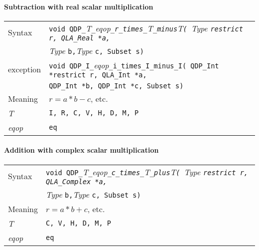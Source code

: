 \documentclass{article}
\newcommand{\tInt}{QDP\ttdash Int }
\newcommand{\tqlaReal}{QLA\ttdash Real }
\newcommand{\tqlaComplex}{QLA\ttdash Complex }
\newcommand{\tqlaInt}{QLA\ttdash Int }
\newcommand{\namespace}{QDP}
\newcommand{\allNumericTypes}{{\tt I, R, C, V, H, D, M, P}}
\newcommand{\ttdash}{{\tt \_}}
\newcommand{\itt}{\it T}
\newcommand{\extraarg}{, Subset s}
\begin{document}
\paragraph{Subtraction with real scalar multiplication}

\begin{flushleft}
  \begin{tabular}{|l|l|}
  \hline
  Syntax      & {{\tt void \namespace}\ttdash\itt\ttdash{\it eqop}\ttdash{\tt r}\ttdash{\tt times}\ttdash\itt\ttdash{\tt minus}\itt{\tt ( }{\it Type }{\tt *restrict r, \tqlaReal *a,}}\\
              & {{\it Type }{\tt *b,}{\it Type }{\tt *c\extraarg)}} \\
  exception   & {\tt void \namespace}\ttdash{\tt I}\ttdash{\it eqop}\ttdash{\tt i}\ttdash{\tt times}\ttdash{\tt I}\ttdash{\tt minus}\ttdash{\tt I( \tInt *restrict r, \tqlaInt *a,}\\
              & {\tt \tInt *b, \tInt *c\extraarg)} \\
  \hline
  Meaning     & $r = a * b - c$, etc. \\
  \hline
  \itt        & \allNumericTypes \\
  \hline
  {\it eqop}  & {\tt eq} \\
  \hline
  \end{tabular}
\end{flushleft}

\paragraph{Addition with complex scalar multiplication}

\begin{flushleft}
  \begin{tabular}{|l|l|}
  \hline
  Syntax      & {\tt void \namespace}\ttdash\itt\ttdash{\it eqop}\ttdash{\tt c}\ttdash{\tt times}\ttdash\itt\ttdash{\tt plus}\itt{\tt ( }{\it Type }{\tt *restrict r, }{\tt \tqlaComplex *a, }\\
              & {\it Type }{\tt *b,}{\it Type }{\tt *c\extraarg)} \\
  \hline
  Meaning     & $r = a * b + c$, etc. \\
  \hline
  \itt        & {\tt C, V, H, D, M, P} \\
  \hline
  {\it eqop}  & {\tt eq} \\
  \hline
  \end{tabular}
\end{flushleft}
\end{document}
